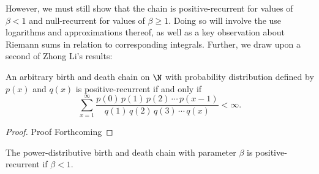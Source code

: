 However, we must still show that the chain is positive-recurrent for values of $\beta < 1$ and
null-recurrent for values of $\beta \geq 1$. Doing so will involve the use logarithms and approximations
thereof, as well as a key observation about Riemann sums in relation to corresponding integrals.
Further, we draw upon a second of Zhong Li's results:
\begin{proposition}
    An arbitrary birth and death chain on $\N$ with probability distribution defined by $p(x)$ and
    $q(x)$ is positive-recurrent if and only if
    \[
        \sum_{x=1}^{\infty} \frac{p(0)\, p(1)\, p(2)\, \cdots\, p(x-1)}{q(1)\, q(2)\, q(3)\, \cdots \,
        q(x)} < \infty.  
    \]
\end{proposition}
\begin{proof}
    Proof Forthcoming
\end{proof}
\begin{proposition}
    The power-distributive birth and death chain with parameter $\beta$ is positive-recurrent if $\beta
    < 1$.
\end{proposition}
